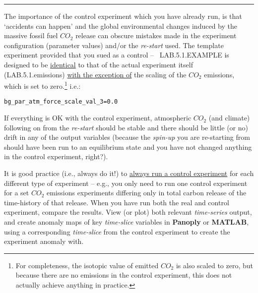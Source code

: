 \vspace{1mm} \noindent\rule{4cm}{0.1mm} \vspace{2mm}

\newpage

\noindent The importance of the control experiment which you have already run, is that ‘accidents can happen’ and the global environmental changes induced by the massive fossil fuel \(CO_{2}\) release can obscure mistakes made in the experiment configuration (parameter values) and/or the \textit{re-start} used. The template experiment provided that you sued as a control -- \textsf{\footnotesize\ LAB.5.1.EXAMPLE} is designed to be \uline{identical} to that of the actual experiment itself (\textsf{\footnotesize LAB.5.1.emissions}) \uline{with the exception of} the scaling of the \(CO_{2}\) emissions, which is set to zero.\footnote{For completeness, the isotopic value of emitted $CO_{2}$ is also scaled to zero, but because there are no emissions in the control experiment, this does not actually achieve anything in practice.}  i.e.:
\vspace{-0pt}\small\begin{verbatim}
bg_par_atm_force_scale_val_3=0.0
\end{verbatim}\normalsize\vspace{-2pt}

\vspace{1mm}

If everything is OK with the control experiment, atmospheric \(CO_{2}\) (and climate) following on from the \textit{re-start} should be stable and there should be little (or no) drift in any of the output variables (because the \textit{spin-up} you are re-starting from should have been run to an equilibrium state and you have not changed anything in the control experiment, right?).

\vspace{1mm}

It is good practice (i.e., always do it!) to \uline{always run a control experiment} for each different type of experiment – e.g., you only need to run one control experiment for a set \(CO_{2}\) emissions experiments differing only in total carbon release of the time-history of that release. When you have run both the real and control experiment, compare the results. View (or plot) both relevant \textit{time-series} output, and create anomaly maps of key \textit{time-slice} variables in \textbf{Panoply} or \textbf{MATLAB}, using a corresponding \textit{time-slice} from the control experiment to create the experiment anomaly with.

